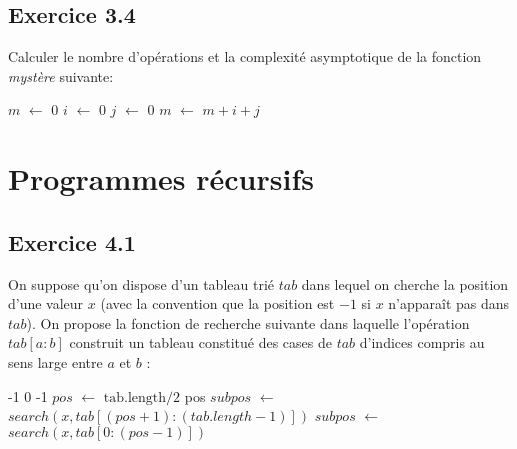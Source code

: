\documentclass{article}[12pt]
\newcommand*\Let[2]{\State #1 $\gets$ #2}
\begin{document}
  \subsection*{Exercice 3.4}
  
  Calculer le nombre d'opérations et la complexité asymptotique de la fonction \textit{mystère} suivante:
  
  
  \begin{tcolorbox}
         \begin{algorithmic}[1]
    \Let{$m$}{0}
    \Let{$i$}{0}
    \Let{$j$}{0}
            \Let{$m$}{$ m + i + j$}
        \EndFor
    \EndFor
  \EndFunction
  \end{algorithmic}
\end{tcolorbox}
  
  
  

 \newpage
  \section{Programmes récursifs}
  
  \subsection*{Exercice 4.1}
  On suppose qu'on dispose d'un tableau trié $tab$ dans lequel on cherche la position d'une valeur $x$ (avec la convention que la position est $ -1 $ si $x$ n'apparaît pas dans $tab$). On propose la fonction de recherche suivante dans laquelle l'opération $tab[a:b]$ construit un tableau constitué des cases de $tab$ d'indices compris au sens large entre $a$ et $b$ :
  
\begin{tcolorbox}
        \begin{algorithmic}[1]
        \State{} -1
    \EndIf
            \State{} 0
        \Else
        \State {} -1
        \EndIf
    \Else
        \Let{$pos$}{$\text{tab.length/2}$}
            \State {} pos
        \EndIf
            \Let{$subpos$}{$search(x,tab[(pos + 1):(tab.length - 1)])$}
                \State {}
            \Else
                \State {}
            \EndIf
        \Else
            \Let{$subpos$}{$search(x,tab[0:(pos - 1)])$}
                \State {}
            \Else
                \State {}
            \EndIf
            
        \EndIf
    \EndIf
  \EndFunction
  \end{algorithmic}
 \end{tcolorbox} 
  
\end{document}
